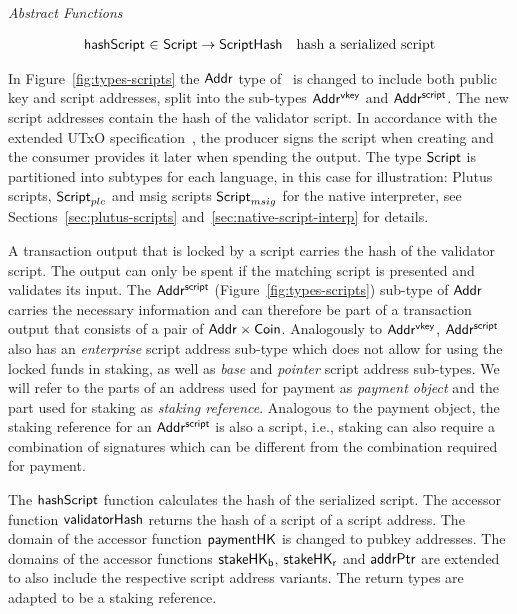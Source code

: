 \documentclass[11pt,a4paper,dvipsnames]{article}
\newcommand{\Addr}{\type{Addr}}
\newcommand{\AddrVKey}{\type{Addr^{vkey}}}
\newcommand{\Coin}{\type{Coin}}
\newcommand{\AddrScr}{\type{Addr^{script}}}
\newcommand{\HashScr}{\type{ScriptHash}}
\newcommand{\Script}{\type{Script}}
\newcommand{\ScriptPlutus}{\Script_{plc}}
\newcommand{\ScriptMSig}{\Script_{msig}}
\theoremstyle{definition}
\begin{document}
\begin{figure*}[hbt]
  \emph{Abstract Functions}

  \begin{equation*}
    \begin{array}{r@{~\in~}lr}
      \fun{hashScript} & \Script \to \HashScr & \text{hash a serialized script}
    \end{array}
  \end{equation*}

  \caption{Types for Scripts and Script Addresses}
  \label{fig:types-scripts}
\end{figure*}

In Figure~\ref{fig:types-scripts} the $\Addr$ type of~\cite{shelley_formal_spec}
is changed to include both public key and script addresses, split into the
sub-types $\AddrVKey$ and $\AddrScr$. The new script addresses contain the hash
of the validator script. In accordance with the extended UTxO
specification~\cite{plutus_eutxo}, the producer signs the script when creating
and the consumer provides it later when spending the output. The type $\Script$
is partitioned into subtypes for each language, in this case for illustration:
Plutus scripts, $\ScriptPlutus$ and msig scripts $\ScriptMSig$ for the native
interpreter, see Sections~\ref{sec:plutus-scripts}
and~\ref{sec:native-script-interp} for details.

A transaction output that is locked by a script carries the hash of the
validator script. The output can only be spent if the matching script is
presented and validates its input. The $\AddrScr$
(Figure~\ref{fig:types-scripts}) sub-type of $\Addr$ carries the necessary
information and can therefore be part of a transaction output that consists of a
pair of $\Addr\times\Coin$. Analogously to $\AddrVKey$, $\AddrScr$ also has an
\emph{enterprise} script address sub-type which does not allow for using the
locked funds in staking, as well as \emph{base} and \emph{pointer} script
address sub-types. We will refer to the parts of an address used for payment as
\emph{payment object} and the part used for staking as \emph{staking
  reference}. Analogous to the payment object, the staking reference for an
$\AddrScr$ is also a script, i.e., staking can also require a combination of
signatures which can be different from the combination required for payment.

The $\mathsf{hashScript}$ function calculates the hash of the serialized
script. The accessor function $\mathsf{validatorHash}$ returns the hash of a script
of a script address. The domain of the accessor function $\mathsf{paymentHK}$ is
changed to pubkey addresses. The domains of the accessor functions
$\mathsf{stakeHK_b}$, $\mathsf{stakeHK_{r}}$ and $\mathsf{addrPtr}$ are extended to also
include the respective script address variants. The return types are adapted to
be a staking reference.
\end{document}
